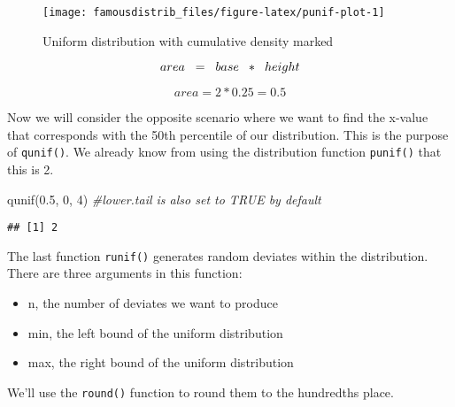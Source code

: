\documentclass[
]{article}
\newenvironment{Shaded}{\begin{snugshade}}{\end{snugshade}}
\newcommand{\CommentTok}[1]{\textcolor[rgb]{0.56,0.35,0.01}{\textit{#1}}}
\newcommand{\DecValTok}[1]{\textcolor[rgb]{0.00,0.00,0.81}{#1}}
\newcommand{\FloatTok}[1]{\textcolor[rgb]{0.00,0.00,0.81}{#1}}
\newcommand{\FunctionTok}[1]{\textcolor[rgb]{0.00,0.00,0.00}{#1}}
\newcommand{\NormalTok}[1]{#1}
\begin{document}
\begin{figure}

{\centering \texttt{[image: famousdistrib\_files/figure-latex/punif-plot-1]} 

}

\caption{Uniform distribution with cumulative density marked}\label{fig:punif-plot}
\end{figure}

\[ area \hspace{0.2 cm}= \hspace{0.2 cm}base \hspace{0.2cm} * \hspace{0.2 cm}height\]

\[area = 2*0.25=0.5\]

Now we will consider the opposite scenario where we want to find the x-value that corresponds with the 50th percentile of our distribution. This is the purpose of \texttt{qunif()}. We already know from using the distribution function \texttt{punif()} that this is 2.

\begin{Shaded}
\begin{Highlighting}[]
\FunctionTok{qunif}\NormalTok{(}\FloatTok{0.5}\NormalTok{, }\DecValTok{0}\NormalTok{, }\DecValTok{4}\NormalTok{) }\CommentTok{\#lower.tail is also set to TRUE by default}
\end{Highlighting}
\end{Shaded}

\begin{verbatim}
## [1] 2
\end{verbatim}

The last function \texttt{runif()} generates random deviates within the distribution. There are three arguments in this function:

\begin{itemize}
\item
  n, the number of deviates we want to produce
\item
  min, the left bound of the uniform distribution
\item
  max, the right bound of the uniform distribution
\end{itemize}

We'll use the \texttt{round()} function to round them to the hundredths place.
\end{document}

